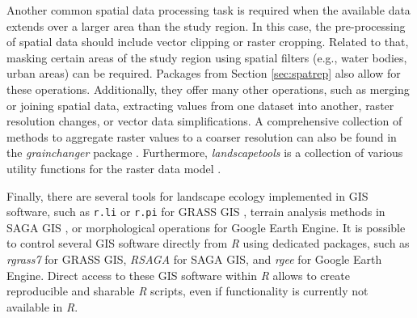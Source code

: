 \documentclass[smallextended]{svjour3}       %
\begin{document}
Another common spatial data processing task is required when the available data extends over a larger area than the study region.
In this case, the pre-processing of spatial data should include vector clipping or raster cropping.
Related to that, masking certain areas of the study region using spatial filters (e.g., water bodies, urban areas) can be required.
Packages from Section \ref{sec:spatrep} also allow for these operations.
Additionally, they offer many other operations, such as merging or joining spatial data, extracting values from one dataset into another, raster resolution changes, or vector data simplifications.
A comprehensive collection of methods to aggregate raster values to a coarser resolution can also be found in the \textit{grainchanger} package \cite{Graham2019}.
Furthermore, \textit{landscapetools} is a collection of various utility functions for the raster data model \cite{Sciaini2018}.

Finally, there are several tools for landscape ecology implemented in GIS software, such as \texttt{r.li} or \texttt{r.pi} for GRASS GIS \cite{Wegmann2018,Neteler2012,Porta2017}, terrain analysis methods in SAGA GIS \cite{Conrad2015}, or morphological operations for Google Earth Engine.
It is possible to control several GIS software directly from \textit{R} using dedicated packages, such as \textit{rgrass7} \cite{Bivand2021} for GRASS GIS, \textit{RSAGA} \cite{Brenning2018} for SAGA GIS, and \textit{rgee} \cite{Aybar2020} for Google Earth Engine.
Direct access to these GIS software within \textit{R} allows to create reproducible and sharable \textit{R} scripts, even if functionality is currently not available in \textit{R}.
\end{document}
